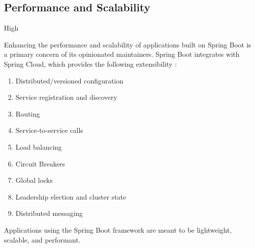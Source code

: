 \subsection*{Performance and Scalability}

\ranking High

Enhancing the performance and scalability of applications built on Spring Boot is a primary concern of its opinionated maintainers. Spring Boot integrates with Spring Cloud, which provides the following extensibility \cite{springCloud} :

\begin{enumerate}
    \item Distributed/versioned configuration
    \item Service registration and discovery
    \item Routing
    \item Service-to-service calls
    \item Load balancing
    \item Circuit Breakers
    \item Global locks
    \item Leadership election and cluster state
    \item Distributed messaging
\end{enumerate}

Applications using the Spring Boot framework are meant to be lightweight, scalable, and performant.